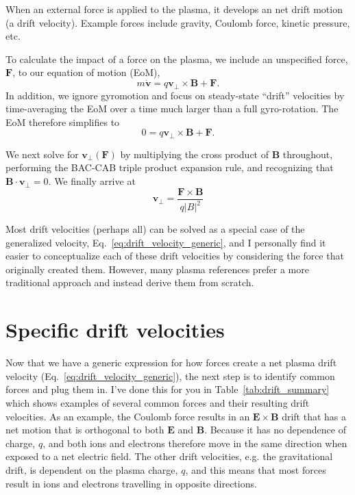 \documentclass[12pt]{iopart}
\begin{document}
When an external force is applied to the plasma, it develops an net drift motion (a drift velocity).  Example forces include gravity, Coulomb force, kinetic pressure, etc.  

To calculate the impact of a force on the plasma, we include an unspecified force, $\mathbf{F}$, to our equation of motion (EoM),
\begin{equation*}
m \dot{\mathbf{v}} = q \mathbf{v}_\perp \times \mathbf{B} + \mathbf{F}.
\end{equation*}
In addition, we ignore gyromotion and focus on steady-state ``drift'' velocities by time-averaging the EoM over a time much larger than a full gyro-rotation.  The EoM therefore simplifies to
\begin{equation*}
0 = q \mathbf{v}_\perp \times \mathbf{B} + \mathbf{F}.
\end{equation*}

We next solve for $\mathbf{v}_\perp (\mathbf{F})$ by multiplying the cross product of $\mathbf{B}$ throughout, performing the BAC-CAB triple product expansion rule, and recognizing that $\mathbf{B} \cdot \mathbf{v}_\perp = 0$.  We finally arrive at 
\begin{equation}
\label{eq:drift_velocity_generic}
\mathbf{v}_\perp = \frac{\mathbf{F} \times \mathbf{B}}{q \left | B \right|^2}
\end{equation}

Most drift velocities (perhaps all) can be solved as a special case of the generalized velocity, Eq.~\ref{eq:drift_velocity_generic}, and I personally find it easier to conceptualize each of these drift velocities by considering the force that originally created them.  However, many plasma references prefer a more traditional approach and instead derive them from scratch.  


\section{Specific drift velocities}

Now that we have a generic expression for how forces create a net plasma drift velocity (Eq.~\ref{eq:drift_velocity_generic}), the next step is to identify common forces and plug them in.  I've done this for you in Table~\ref{tab:drift_summary} which shows examples of several common forces and their resulting drift velocities.  As an example, the Coulomb force results in an $\mathbf{E} \times \mathbf{B} $ drift that has a net motion that is orthogonal to both $\mathbf{E}$ and $\mathbf{B}$.  Because it has no dependence of charge, $q$, and both ions and electrons therefore move in the same direction when exposed to a net electric field.  The other drift velocities, e.g. the gravitational drift, is dependent on the plasma charge, $q$, and this means that most forces result in ions and electrons travelling in opposite directions.  
\end{document}
